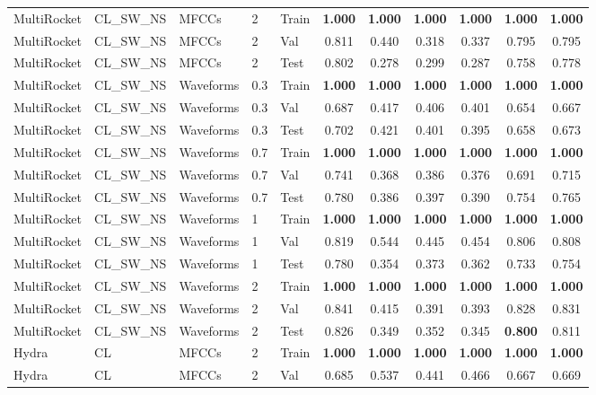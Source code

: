 \begin{landscape}
\begin{longtable}{|l|l|l|l|l|c|c|c|c|c|c|}
MultiRocket & CL\_SW\_NS & MFCCs & 2 & Train & \textbf{1.000} & \textbf{1.000} & \textbf{1.000} & \textbf{1.000} & \textbf{1.000} & \textbf{1.000} \\
MultiRocket & CL\_SW\_NS & MFCCs & 2 & Val & 0.811 & 0.440 & 0.318 & 0.337 & 0.795 & 0.795 \\
MultiRocket & CL\_SW\_NS & MFCCs & 2 & Test & 0.802 & 0.278 & 0.299 & 0.287 & 0.758 & 0.778 \\
MultiRocket & CL\_SW\_NS & Waveforms & 0.3 & Train & \textbf{1.000} & \textbf{1.000} & \textbf{1.000} & \textbf{1.000} & \textbf{1.000} & \textbf{1.000} \\
MultiRocket & CL\_SW\_NS & Waveforms & 0.3 & Val & 0.687 & 0.417 & 0.406 & 0.401 & 0.654 & 0.667 \\
MultiRocket & CL\_SW\_NS & Waveforms & 0.3 & Test & 0.702 & 0.421 & 0.401 & 0.395 & 0.658 & 0.673 \\
MultiRocket & CL\_SW\_NS & Waveforms & 0.7 & Train & \textbf{1.000} & \textbf{1.000} & \textbf{1.000} & \textbf{1.000} & \textbf{1.000} & \textbf{1.000} \\
MultiRocket & CL\_SW\_NS & Waveforms & 0.7 & Val & 0.741 & 0.368 & 0.386 & 0.376 & 0.691 & 0.715 \\
MultiRocket & CL\_SW\_NS & Waveforms & 0.7 & Test & 0.780 & 0.386 & 0.397 & 0.390 & 0.754 & 0.765 \\
MultiRocket & CL\_SW\_NS & Waveforms & 1 & Train & \textbf{1.000} & \textbf{1.000} & \textbf{1.000} & \textbf{1.000} & \textbf{1.000} & \textbf{1.000} \\
MultiRocket & CL\_SW\_NS & Waveforms & 1 & Val & 0.819 & 0.544 & 0.445 & 0.454 & 0.806 & 0.808 \\
MultiRocket & CL\_SW\_NS & Waveforms & 1 & Test & 0.780 & 0.354 & 0.373 & 0.362 & 0.733 & 0.754 \\
MultiRocket & CL\_SW\_NS & Waveforms & 2 & Train & \textbf{1.000} & \textbf{1.000} & \textbf{1.000} & \textbf{1.000} & \textbf{1.000} & \textbf{1.000} \\
MultiRocket & CL\_SW\_NS & Waveforms & 2 & Val & 0.841 & 0.415 & 0.391 & 0.393 & 0.828 & 0.831 \\
MultiRocket & CL\_SW\_NS & Waveforms & 2 & Test & 0.826 & 0.349 & 0.352 & 0.345 & \textbf{0.800} & 0.811 \\
Hydra & CL & MFCCs & 2 & Train & \textbf{1.000} & \textbf{1.000} & \textbf{1.000} & \textbf{1.000} & \textbf{1.000} & \textbf{1.000} \\
Hydra & CL & MFCCs & 2 & Val & 0.685 & 0.537 & 0.441 & 0.466 & 0.667 & 0.669 \\

\end{longtable}
\end{landscape}
